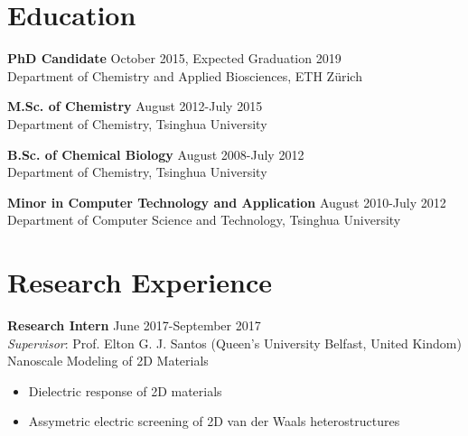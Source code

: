 \documentclass[margin]{res}
\begin{document}


\address{ HCI D120 \\
          Vladimir-Prelog-Weg 1/5 \\
          ETH Z\"{u}rich, CH-8093, Z\"{u}rich, Switzerland \\
          +41-44-63-37330 \\
          Mail: tian.tian@chem.ethz.ch}
\address{{} \\  \\  \\
        }

\begin{resume}


\section{Education}

\textbf{PhD Candidate} \hfill October 2015, Expected Graduation 2019\\
Department of Chemistry and Applied Biosciences, ETH Z\"{u}rich

\textbf{M.Sc. of Chemistry}  \hfill August 2012-July 2015\\
Department of Chemistry, Tsinghua University

\textbf{B.Sc. of Chemical Biology}  \hfill August 2008-July 2012\\
Department of Chemistry, Tsinghua University

\textbf{Minor in Computer Technology and Application}  \hfill August 2010-July 2012\\
Department of Computer Science and Technology, Tsinghua University

\section{Research Experience}

\textbf{Research Intern} \hfill June 2017-September 2017\\
\textit{Supervisor}: Prof. Elton G. J. Santos (Queen's University Belfast, United Kindom)\\
Nanoscale Modeling of 2D Materials
\begin{itemize} \itemsep -2pt
\item Dielectric response of 2D materials
\item Assymetric electric screening of 2D van der Waals heterostructures
\end{itemize}



\end{resume}
\end{document}
